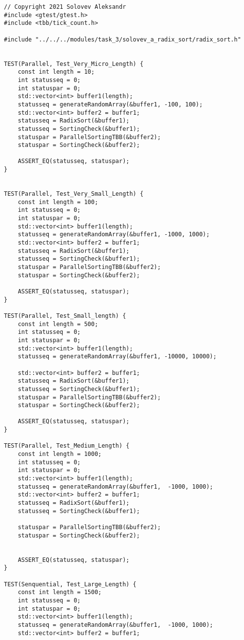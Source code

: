 \documentclass{report}
\begin{document}
\begin{lstlisting}
// Copyright 2021 Solovev Aleksandr
#include <gtest/gtest.h>
#include <tbb/tick_count.h>

#include "../../../modules/task_3/solovev_a_radix_sort/radix_sort.h"


TEST(Parallel, Test_Very_Micro_Length) {
    const int length = 10;
    int statusseq = 0;
    int statuspar = 0;
    std::vector<int> buffer1(length);
    statusseq = generateRandomArray(&buffer1, -100, 100);
    std::vector<int> buffer2 = buffer1;
    statusseq = RadixSort(&buffer1);
    statusseq = SortingCheck(&buffer1);
    statuspar = ParallelSortingTBB(&buffer2);
    statuspar = SortingCheck(&buffer2);

    ASSERT_EQ(statusseq, statuspar);
}


TEST(Parallel, Test_Very_Small_Length) {
    const int length = 100;
    int statusseq = 0;
    int statuspar = 0;
    std::vector<int> buffer1(length);
    statusseq = generateRandomArray(&buffer1, -1000, 1000);
    std::vector<int> buffer2 = buffer1;
    statusseq = RadixSort(&buffer1);
    statusseq = SortingCheck(&buffer1);
    statuspar = ParallelSortingTBB(&buffer2);
    statuspar = SortingCheck(&buffer2);

    ASSERT_EQ(statusseq, statuspar);
}

TEST(Parallel, Test_Small_length) {
    const int length = 500;
    int statusseq = 0;
    int statuspar = 0;
    std::vector<int> buffer1(length);
    statusseq = generateRandomArray(&buffer1, -10000, 10000);

    std::vector<int> buffer2 = buffer1;
    statusseq = RadixSort(&buffer1);
    statusseq = SortingCheck(&buffer1);
    statuspar = ParallelSortingTBB(&buffer2);
    statuspar = SortingCheck(&buffer2);

    ASSERT_EQ(statusseq, statuspar);
}

TEST(Parallel, Test_Medium_Length) {
    const int length = 1000;
    int statusseq = 0;
    int statuspar = 0;
    std::vector<int> buffer1(length);
    statusseq = generateRandomArray(&buffer1,  -1000, 1000);
    std::vector<int> buffer2 = buffer1;
    statusseq = RadixSort(&buffer1);
    statusseq = SortingCheck(&buffer1);

    statuspar = ParallelSortingTBB(&buffer2);
    statuspar = SortingCheck(&buffer2);


    ASSERT_EQ(statusseq, statuspar);
}

TEST(Senquential, Test_Large_Length) {
    const int length = 1500;
    int statusseq = 0;
    int statuspar = 0;
    std::vector<int> buffer1(length);
    statusseq = generateRandomArray(&buffer1,  -1000, 1000);
    std::vector<int> buffer2 = buffer1;


\end{lstlisting}
\end{document}
